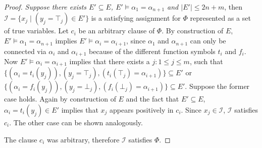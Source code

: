 \begin{proof}
\emph{Suppose there exists $E' \subseteq E$, $E' \models \alpha_1 = \alpha_{n+1}$ and $|E'| \leq 2n + m$}, then $\mathcal{I} = \{x_j \mid (y_j = \top_j) \in E'\}$ is a satisfying assignment for $\Phi$ represented as a set of true variables.
Let $c_i$ be an arbitrary clause of $\Phi$.
By construction of $E$, $E' \models \alpha_1 = \alpha_{n+1}$ implies $E' \models \alpha_i = \alpha_{i+1}$, since $\alpha_1$ and $\alpha_{n+1}$ can only be connected via $\alpha_i$ and $\alpha_{i+1}$ because of the different function symbols $t_i$ and $f_i$.
Now $E' \models \alpha_i = \alpha_{i+1}$ implies that there exists a $j: 1 \leq j \leq m$, such that $\{(\alpha_i = t_i(y_j)),(y_j = \top_j),(t_i(\top_j) = \alpha_{i+1})\} \subseteq E'$ or $\{(\alpha_i = f_i(y_j)),(y_j = \bot_j),(f_i(\bot_j) = \alpha_{i+1})\} \subseteq E'$. 
Suppose the former case holds.
Again by construction of $E$ and the fact that $E' \subseteq E$, $\alpha_i = t_i(y_j) \in E'$ implies that $x_j$ appears positively in $c_i$.
Since $x_j \in \mathcal{I}$, $\mathcal{I}$ satisfies $c_i$.
The other case can be shown analogously.

The clause $c_i$ was arbitrary, therefore $\mathcal{I}$ satisfies $\Phi$.

\end{proof}